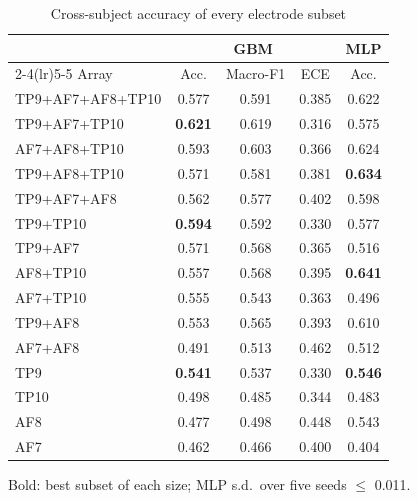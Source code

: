 \begin{table}[!t]
\caption{Cross-subject accuracy of every electrode subset}
\label{tab:subsets}
\centering\footnotesize
\setlength{\tabcolsep}{4.5pt}
\begin{tabular}{lcccc}
\toprule
 & \multicolumn{3}{c}{GBM} & MLP \\
\cmidrule(lr){2-4}\cmidrule(lr){5-5}
Array & Acc. & Macro-F1 & ECE & Acc. \\
\midrule
TP9+AF7+AF8+TP10 & 0.577 & 0.591 & 0.385 & 0.622 \\
\midrule
TP9+AF7+TP10 & \textbf{0.621} & 0.619 & 0.316 & 0.575 \\
AF7+AF8+TP10 & 0.593 & 0.603 & 0.366 & 0.624 \\
TP9+AF8+TP10 & 0.571 & 0.581 & 0.381 & \textbf{0.634} \\
TP9+AF7+AF8 & 0.562 & 0.577 & 0.402 & 0.598 \\
\midrule
TP9+TP10 & \textbf{0.594} & 0.592 & 0.330 & 0.577 \\
TP9+AF7 & 0.571 & 0.568 & 0.365 & 0.516 \\
AF8+TP10 & 0.557 & 0.568 & 0.395 & \textbf{0.641} \\
AF7+TP10 & 0.555 & 0.543 & 0.363 & 0.496 \\
TP9+AF8 & 0.553 & 0.565 & 0.393 & 0.610 \\
AF7+AF8 & 0.491 & 0.513 & 0.462 & 0.512 \\
\midrule
TP9 & \textbf{0.541} & 0.537 & 0.330 & \textbf{0.546} \\
TP10 & 0.498 & 0.485 & 0.344 & 0.483 \\
AF8 & 0.477 & 0.498 & 0.448 & 0.543 \\
AF7 & 0.462 & 0.466 & 0.400 & 0.404 \\
\bottomrule
\end{tabular}
\par\smallskip
\parbox{\columnwidth}{\footnotesize Bold: best subset of each size; MLP s.d.\ over five seeds $\le$ 0.011.}
\end{table}
